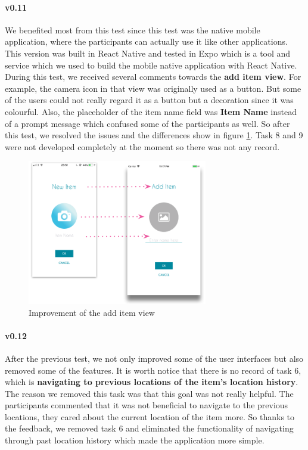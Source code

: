 \documentclass[12pt,a4paper]{article}
\begin{document}
          \paragraph{v0.11} We benefited most from this test since this test was the native mobile application, where the participants can actually use it like other applications. This version was built in React Native and tested in Expo which is a tool and service which we used to build the mobile native application with React Native. During this test, we received several comments towards the {\bf add item view}. For example, the camera icon in that view was originally used as a button. But some of the users could not really regard it as a button but a decoration since it was colourful. Also, the placeholder of the item name field was {\bf Item Name} instead of a prompt message which confused some of the participants as well. So after this test, we resolved the issues and the differences show in figure \ref{fig:usability-test-ios-v010-improvements}. Task 8 and 9 were not developed completely at the moment so there was not any record.

          \begin{figure}[H]
            \centering
            \includegraphics[width=0.7\textwidth]{../assets/usability-test-ios-v010-improvements.png}
            \caption{Improvement of the add item view}
            \label{fig:usability-test-ios-v010-improvements}
          \end{figure}

          \paragraph{v0.12} After the previous test, we not only improved some of the user interfaces but also removed some of the features. It is worth notice that there is no record of task 6, which is {\bf navigating to previous locations of the item's location history}. The reason we removed this task was that this goal was not really helpful. The participants commented that it was not beneficial to navigate to the previous locations, they cared about the current location of the item more. So thanks to the feedback, we removed task 6 and eliminated the functionality of navigating through past location history which made the application more simple. 
        
\end{document}
